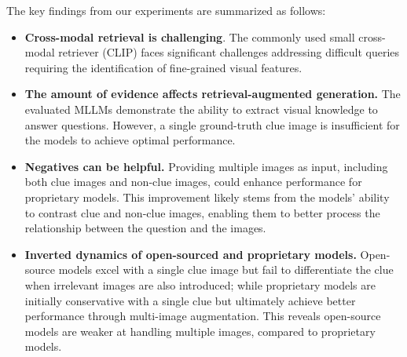 The key findings from our experiments are summarized as follows: %
\begin{itemize}
    \item \textbf{Cross-modal retrieval is challenging}. The commonly used small cross-modal retriever (CLIP) faces significant challenges addressing difficult queries requiring the identification of fine-grained visual features. %
    \item \textbf{The amount of evidence affects retrieval-augmented generation.} The evaluated MLLMs demonstrate the ability to extract visual knowledge to answer questions. However, a single ground-truth clue image is insufficient for the models to achieve optimal performance.
    \item \textbf{Negatives can be helpful.} Providing multiple images as input, including both clue images and non-clue images, could enhance performance for proprietary models. This improvement likely stems from the models' ability to contrast clue and non-clue images, enabling them to better process the relationship between the question and the images.
    \item \textbf{Inverted dynamics of open-sourced and proprietary models.} Open-source models excel with a single clue image but fail to differentiate the clue when irrelevant images are also introduced; while proprietary models are initially conservative with a single clue but ultimately achieve better performance through multi-image augmentation. This reveals open-source models are weaker at handling multiple images, compared to proprietary models. %
\end{itemize}

